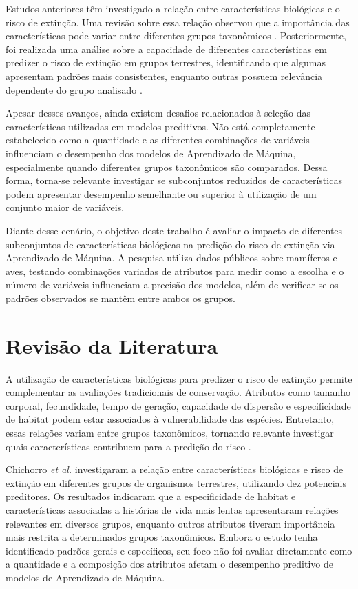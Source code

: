 \documentclass[conference]{IEEEtran}
\begin{document}
Estudos anteriores têm investigado a relação entre características biológicas e o risco de extinção. Uma revisão sobre essa relação observou que a importância das características pode variar entre diferentes grupos taxonômicos \cite{b4}. Posteriormente, foi realizada uma análise sobre a capacidade de diferentes características em predizer o risco de extinção em grupos terrestres, identificando que algumas apresentam padrões mais consistentes, enquanto outras possuem relevância dependente do grupo analisado \cite{b5}.

Apesar desses avanços, ainda existem desafios relacionados à seleção das características utilizadas em modelos preditivos. Não está completamente estabelecido como a quantidade e as diferentes combinações de variáveis influenciam o desempenho dos modelos de Aprendizado de Máquina, especialmente quando diferentes grupos taxonômicos são comparados. Dessa forma, torna-se relevante investigar se subconjuntos reduzidos de características podem apresentar desempenho semelhante ou superior à utilização de um conjunto maior de variáveis.

Diante desse cenário, o objetivo deste trabalho é avaliar o impacto de diferentes subconjuntos de características biológicas na predição do risco de extinção via Aprendizado de Máquina. A pesquisa utiliza dados públicos sobre mamíferos e aves, testando combinações variadas de atributos para medir como a escolha e o número de variáveis influenciam a precisão dos modelos, além de verificar se os padrões observados se mantêm entre ambos os grupos.

\section{Revisão da Literatura}

A utilização de características biológicas para predizer o risco de extinção permite complementar as avaliações tradicionais de conservação. Atributos como tamanho corporal, fecundidade, tempo de geração, capacidade de dispersão e especificidade de habitat podem estar associados à vulnerabilidade das espécies. Entretanto, essas relações variam entre grupos taxonômicos, tornando relevante investigar quais características contribuem para a predição do risco \cite{b4,b5}.

Chichorro \textit{et al.} \cite{b5} investigaram a relação entre características biológicas e risco de extinção em diferentes grupos de organismos terrestres, utilizando dez potenciais preditores. Os resultados indicaram que a especificidade de habitat e características associadas a histórias de vida mais lentas apresentaram relações relevantes em diversos grupos, enquanto outros atributos tiveram importância mais restrita a determinados grupos taxonômicos. Embora o estudo tenha identificado padrões gerais e específicos, seu foco não foi avaliar diretamente como a quantidade e a composição dos atributos afetam o desempenho preditivo de modelos de Aprendizado de Máquina.
\end{document}
